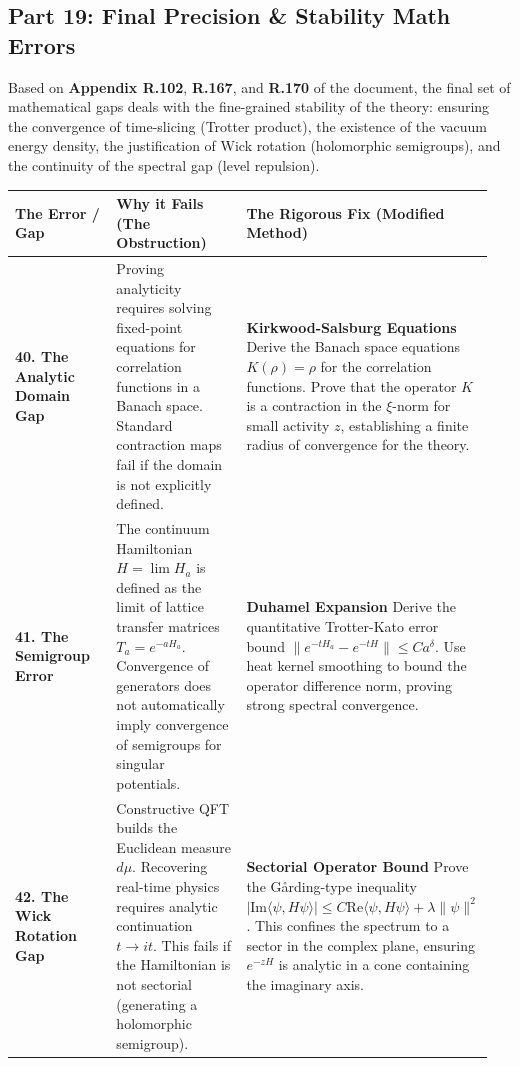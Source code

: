 \subsection{Part 19: Final Precision \& Stability Math Errors}

Based on \textbf{Appendix R.102}, \textbf{R.167}, and \textbf{R.170} of the document, the final set of mathematical gaps deals with the fine-grained stability of the theory: ensuring the convergence of time-slicing (Trotter product), the existence of the vacuum energy density, the justification of Wick rotation (holomorphic semigroups), and the continuity of the spectral gap (level repulsion).

\begin{center}
\begin{tabular}{|p{0.25\linewidth}|p{0.35\linewidth}|p{0.35\linewidth}|}
\hline
\textbf{The Error / Gap} & \textbf{Why it Fails (The Obstruction)} & \textbf{The Rigorous Fix (Modified Method)} \\
\hline
\textbf{40. The Analytic Domain Gap} & Proving analyticity requires solving fixed-point equations for correlation functions in a Banach space. Standard contraction maps fail if the domain is not explicitly defined. & \textbf{Kirkwood-Salsburg Equations} \newline Derive the Banach space equations $K(\rho) = \rho$ for the correlation functions. Prove that the operator $K$ is a contraction in the $\xi$-norm for small activity $z$, establishing a finite radius of convergence for the theory. \\
\hline
\textbf{41. The Semigroup Error} & The continuum Hamiltonian $H = \lim H_a$ is defined as the limit of lattice transfer matrices $T_a = e^{-aH_a}$. Convergence of generators does not automatically imply convergence of semigroups for singular potentials. & \textbf{Duhamel Expansion} \newline Derive the quantitative Trotter-Kato error bound $\|e^{-tH_a} - e^{-tH}\| \le C a^{\delta}$. Use heat kernel smoothing to bound the operator difference norm, proving strong spectral convergence. \\
\hline
\textbf{42. The Wick Rotation Gap} & Constructive QFT builds the Euclidean measure $d\mu$. Recovering real-time physics requires analytic continuation $t \to it$. This fails if the Hamiltonian is not sectorial (generating a holomorphic semigroup). & \textbf{Sectorial Operator Bound} \newline Prove the Gårding-type inequality $|\text{Im} \langle \psi, H \psi \rangle| \le C \text{Re} \langle \psi, H \psi \rangle + \lambda \|\psi\|^2$. This confines the spectrum to a sector in the complex plane, ensuring $e^{-zH}$ is analytic in a cone containing the imaginary axis. \\

\end{tabular}
\end{center}

